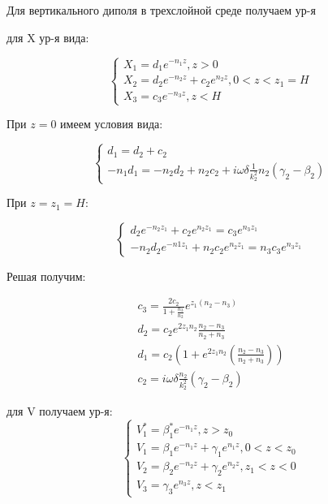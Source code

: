 


	\newpage 
	Для вертикального диполя в трехслойной среде получаем ур-я
	
	для X ур-я вида:
	
	\begin{equation}
		\begin{cases}
			X_1 = d_1 e^{-n_1 z}, z > 0 \\
			X_2 = d_2 e^{-n_2 z} + c_2 e^{n_2 z}, 0 < z < z_1 = H \\
			X_3 = c_3 e^{-n_3 z}, z < H
			
		\end{cases}		
	\end{equation}
	
	
	При $z = 0$ имеем условия вида:
	
	\begin{equation}
		\begin{cases}
			d_1 = d_2 + c_2 \\
			-n_1 d_1 = -n_2 d_2 + n_2 c_2 + i \omega \delta \frac{1}{k_2^2}n_2 (\gamma_2 - \beta_2)
			
		\end{cases}
	\end{equation}
	
	При $z = z_1 = H$:
	
	\begin{equation}
		\begin{cases}
			d_2 e^{-n_2 z_1} + c_2 e^{n_2 z_1} = c_3 e^{n_3 z_1} \\
			-n_2 d_2 e^{-n1 z_1} + n_2 c_2 e^{n_2 z_1} = n_3 c_3 e^{n_3 z_1}
		\end{cases}
	\end{equation}
	
	Решая получим:
	
	\begin{equation}
		\begin{aligned}
			c_3  = \frac{2 c_2}{1 + \frac{n_3}{n_2}} e^{z_1(n_2 - n_3)}\\
			d_2 = c_2 e^{2 z_1 n_2} \frac{n_2 - n_3}{n_2 + n_3} \\
			d_1 = c_2 (1 + e^{2 z_1 n_2} (\frac{n_2 - n_3}{n_2 + n_3})) \\
			c_2 = i \omega \delta \frac{n_2}{k_2^2} (\gamma_2 - \beta_2)
		\end{aligned}
	\end{equation}
	
	\newpage
	
	для V получаем ур-я:
	\begin{equation}
		\begin{cases}
			V_1^* = \beta_1^* e^{-n_1 z}, z > z_0 \\
			V_1 = \beta_1 e^{-n_1 z} + \gamma_1 e^{n_1 z}, 0 < z < z_0 \\
			V_2 = \beta_2 e^{-n_2 z} + \gamma_2 e^{n_2 z}, z_1 < z < 0 \\
			V_3 = \gamma_3 e^{n_3 z}, z < z_1
		\end{cases}
	\end{equation}
	
